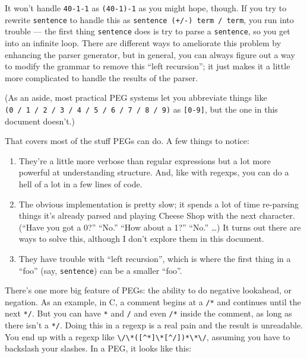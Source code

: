 \documentclass[
]{article}
\providecommand{\tightlist}{%
  \setlength{\itemsep}{0pt}\setlength{\parskip}{0pt}}
\begin{document}
It won't handle \texttt{40-1-1} as \texttt{(40-1)-1} as you might hope,
though. If you try to rewrite \texttt{sentence} to handle this as
\texttt{sentence\ (\textquotesingle{}+\textquotesingle{}/\textquotesingle{}-\textquotesingle{})\ term\ /\ term},
you run into trouble --- the first thing \texttt{sentence} does is try
to parse a \texttt{sentence}, so you get into an infinite loop. There
are different ways to ameliorate this problem by enhancing the parser
generator, but in general, you can always figure out a way to modify the
grammar to remove this ``left recursion''; it just makes it a little
more complicated to handle the results of the parser.

(As an aside, most practical PEG systems let you abbreviate things like
\texttt{(\textquotesingle{}0\textquotesingle{}\ /\ \textquotesingle{}1\textquotesingle{}\ /\ \textquotesingle{}2\textquotesingle{}\ /\ \textquotesingle{}3\textquotesingle{}\ /\ \textquotesingle{}4\textquotesingle{}\ /\ \textquotesingle{}5\textquotesingle{}\ /\ \textquotesingle{}6\textquotesingle{}\ /\ \textquotesingle{}7\textquotesingle{}\ /\ \textquotesingle{}8\textquotesingle{}\ /\ \textquotesingle{}9\textquotesingle{})}
as \texttt{{[}0-9{]}}, but the one in this document doesn't.)

That covers most of the stuff PEGs can do. A few things to notice:

\begin{enumerate}
\def\labelenumi{\arabic{enumi}.}
\tightlist
\item
  They're a little more verbose than regular expressions but a lot more
  powerful at understanding structure. And, like with regexps, you can
  do a hell of a lot in a few lines of code.
\item
  The obvious implementation is pretty slow; it spends a lot of time
  re-parsing things it's already parsed and playing Cheese Shop with the
  next character. (``Have you got a 0?'' ``No.'' ``How about a 1?''
  ``No.'' \ldots) It turns out there are ways to solve this, although I
  don't explore them in this document.
\item
  They have trouble with ``left recursion'', which is where the first
  thing in a ``foo'' (say, \texttt{sentence}) can be a smaller ``foo''.
\end{enumerate}

There's one more big feature of PEGs: the ability to do negative
lookahead, or negation. As an example, in C, a comment begins at a
\texttt{/*} and continues until the next \texttt{*/}. But you can have
\texttt{*} and \texttt{/} and even \texttt{/*} inside the comment, as
long as there isn't a \texttt{*/}. Doing this in a regexp is a real pain
and the result is unreadable. You end up with a regexp like
\texttt{\textbackslash{}/\textbackslash{}*({[}\^{}*{]}\textbar{}\textbackslash{}*{[}\^{}/{]})*\textbackslash{}*\textbackslash{}/},
assuming you have to backslash your slashes. In a PEG, it looks like
this:
\end{document}
